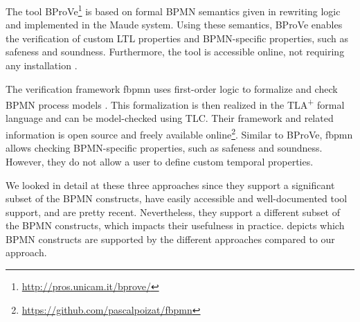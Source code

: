 \documentclass[adraft, copyright, creativecommons]{eptcs} %
\begin{document}
The tool BProVe\footnote{\url{http://pros.unicam.it/bprove/}} is based on formal BPMN semantics given in rewriting logic and implemented in the Maude system.
Using these semantics, BProVe enables the verification of custom LTL properties and BPMN-specific properties, such as safeness and soundness.
Furthermore, the tool is accessible online, not requiring any installation \cite{corradiniFormalApproachAnalysis2021}.

The verification framework \textsf{fbpmn} uses first-order logic to formalize and check BPMN process models \cite{houhouFirstOrderLogicVerification2022}.
This formalization is then realized in the TLA\textsuperscript{+} formal language and can be model-checked using TLC.
Their framework and related information is open source and freely available online\footnote{\url{https://github.com/pascalpoizat/fbpmn}}.
Similar to BProVe, \textsf{fbpmn} allows checking BPMN-specific properties, such as safeness and soundness.
However, they do not allow a user to define custom temporal properties.

We looked in detail at these three approaches since they support a significant subset of the BPMN constructs, have easily accessible and well-documented tool support, and are pretty recent.
Nevertheless, they support a different subset of the BPMN constructs, which impacts their usefulness in practice.
 depicts which BPMN constructs are supported by the different approaches compared to our approach.
\end{document}
